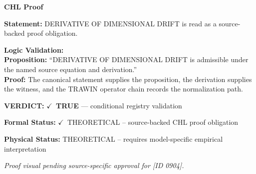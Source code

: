 \vspace{0.45em}
\noindent\textbf{CHL Proof}\par
\textbf{Statement:} DERIVATIVE OF DIMENSIONAL DRIFT is read as a source-backed proof obligation.

\textbf{Logic Validation:}\\
\textbf{Proposition:} ``DERIVATIVE OF DIMENSIONAL DRIFT is admissible under the named source equation and derivation.''\\
\textbf{Proof:} The canonical statement supplies the proposition, the derivation supplies the witness, and the TRAWIN operator chain records the normalization path.

\textbf{VERDICT:} \ensuremath{\checkmark}\ \textbf{TRUE} --- conditional registry validation

\textbf{Formal Status:} \ensuremath{\checkmark}\ THEORETICAL -- source-backed CHL proof obligation

\textbf{Physical Status:} THEORETICAL -- requires model-specific empirical interpretation
\par\vspace{0.45em}
\par
\vfill
\begingroup\footnotesize\itshape
Proof visual pending source-specific approval for [ID 0904].
\par\endgroup
\vfill
\endgroup
\endgroup
